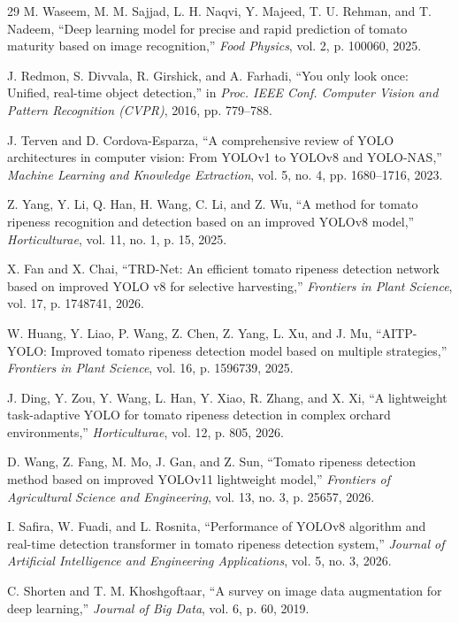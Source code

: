 \documentclass[journal]{IEEEtran}
\begin{document}
\begin{thebibliography}{29}
M. Waseem, M. M. Sajjad, L. H. Naqvi, Y. Majeed, T. U. Rehman, and T. Nadeem, ``Deep learning model for precise and rapid prediction of tomato maturity based on image recognition,'' \emph{Food Physics}, vol. 2, p. 100060, 2025.

J. Redmon, S. Divvala, R. Girshick, and A. Farhadi, ``You only look once: Unified, real-time object detection,'' in \emph{Proc. IEEE Conf. Computer Vision and Pattern Recognition (CVPR)}, 2016, pp. 779--788.

J. Terven and D. Cordova-Esparza, ``A comprehensive review of YOLO architectures in computer vision: From YOLOv1 to YOLOv8 and YOLO-NAS,'' \emph{Machine Learning and Knowledge Extraction}, vol. 5, no. 4, pp. 1680--1716, 2023.

Z. Yang, Y. Li, Q. Han, H. Wang, C. Li, and Z. Wu, ``A method for tomato ripeness recognition and detection based on an improved YOLOv8 model,'' \emph{Horticulturae}, vol. 11, no. 1, p. 15, 2025.

X. Fan and X. Chai, ``TRD-Net: An efficient tomato ripeness detection network based on improved YOLO v8 for selective harvesting,'' \emph{Frontiers in Plant Science}, vol. 17, p. 1748741, 2026.

W. Huang, Y. Liao, P. Wang, Z. Chen, Z. Yang, L. Xu, and J. Mu, ``AITP-YOLO: Improved tomato ripeness detection model based on multiple strategies,'' \emph{Frontiers in Plant Science}, vol. 16, p. 1596739, 2025.

J. Ding, Y. Zou, Y. Wang, L. Han, Y. Xiao, R. Zhang, and X. Xi, ``A lightweight task-adaptive YOLO for tomato ripeness detection in complex orchard environments,'' \emph{Horticulturae}, vol. 12, p. 805, 2026.

D. Wang, Z. Fang, M. Mo, J. Gan, and Z. Sun, ``Tomato ripeness detection method based on improved YOLOv11 lightweight model,'' \emph{Frontiers of Agricultural Science and Engineering}, vol. 13, no. 3, p. 25657, 2026.

I. Safira, W. Fuadi, and L. Rosnita, ``Performance of YOLOv8 algorithm and real-time detection transformer in tomato ripeness detection system,'' \emph{Journal of Artificial Intelligence and Engineering Applications}, vol. 5, no. 3, 2026.

C. Shorten and T. M. Khoshgoftaar, ``A survey on image data augmentation for deep learning,'' \emph{Journal of Big Data}, vol. 6, p. 60, 2019.


\end{thebibliography}
\end{document}
